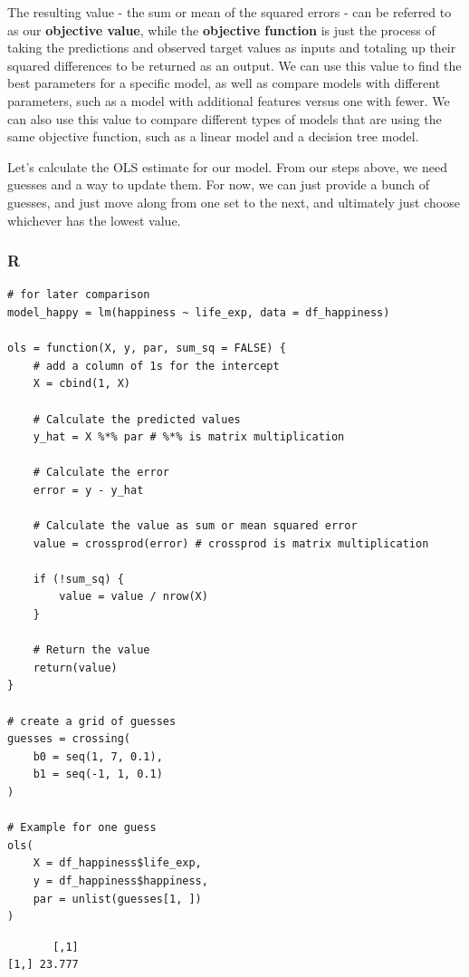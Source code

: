 \documentclass[
  letterpaper,
]{krantz}
\begin{document}
The resulting value - the sum or mean of the squared errors - can be
referred to as our \textbf{objective value}, while the \textbf{objective
function} is just the process of taking the predictions and observed
target values as inputs and totaling up their squared differences to be
returned as an output. We can use this value to find the best parameters
for a specific model, as well as compare models with different
parameters, such as a model with additional features versus one with
fewer. We can also use this value to compare different types of models
that are using the same objective function, such as a linear model and a
decision tree model.

Let's calculate the OLS estimate for our model. From our steps above, we
need guesses and a way to update them. For now, we can just provide a
bunch of guesses, and just move along from one set to the next, and
ultimately just choose whichever has the lowest value.

\subsubsection{R}

\begin{verbatim}
# for later comparison
model_happy = lm(happiness ~ life_exp, data = df_happiness)

ols = function(X, y, par, sum_sq = FALSE) {
    # add a column of 1s for the intercept
    X = cbind(1, X)

    # Calculate the predicted values
    y_hat = X %*% par # %*% is matrix multiplication

    # Calculate the error
    error = y - y_hat

    # Calculate the value as sum or mean squared error
    value = crossprod(error) # crossprod is matrix multiplication

    if (!sum_sq) {
        value = value / nrow(X)
    }

    # Return the value
    return(value)
}

# create a grid of guesses
guesses = crossing(
    b0 = seq(1, 7, 0.1),
    b1 = seq(-1, 1, 0.1)
)

# Example for one guess
ols(
    X = df_happiness$life_exp,
    y = df_happiness$happiness,
    par = unlist(guesses[1, ])
)
\end{verbatim}

\begin{verbatim}
       [,1]
[1,] 23.777
\end{verbatim}
\end{document}
